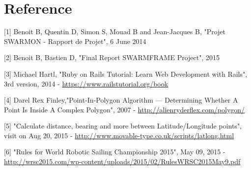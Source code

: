 \section{Reference}

[1] Benoit B, Quentin D, Simon S, Mouad B and Jean-Jacques B, "Projet SWARMON - Rapport de Projet", 6 June 2014
 \medskip
 
[2] Benoit B, Bastien D, "Final Report SWARMFRAME Project", 2015
 \medskip

[3] Michael Hartl, "Ruby on Rails Tutorial: Learn Web Development with Rails", 3rd version, 2014 - \url{https://www.railstutorial.org/book}
 \medskip

[4] Darel Rex Finley,"Point-In-Polygon Algorithm — Determining Whether A Point Is Inside A Complex Polygon", 2007 - \url{http://alienryderflex.com/polygon/}
 \medskip

[5] "Calculate distance, bearing and more between Latitude/Longitude points", visit on Aug 20, 2015 - \url{http://www.movable-type.co.uk/scripts/latlong.html}
 \medskip

[6] "Rules for World Robotic Sailing Championship 2015", May 09, 2015 - \url{http://wrsc2015.com/wp-content/uploads/2015/02/RulesWRSC2015May9.pdf}
